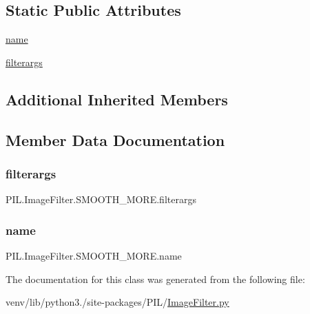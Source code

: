 \subsection*{Static Public Attributes}
\begin{DoxyCompactItemize}
\item 
\hyperlink{classPIL_1_1ImageFilter_1_1SMOOTH__MORE_ad59cec7725b103fb84d3dcf920c47fec}{name}
\item 
\hyperlink{classPIL_1_1ImageFilter_1_1SMOOTH__MORE_a916ddbacb9eecb9fd99a76a0aa2733a0}{filterargs}
\end{DoxyCompactItemize}
\subsection*{Additional Inherited Members}


\subsection{Member Data Documentation}
\mbox{\label{classPIL_1_1ImageFilter_1_1SMOOTH__MORE_a916ddbacb9eecb9fd99a76a0aa2733a0}} 
\subsubsection{\texorpdfstring{filterargs}{filterargs}}
{\footnotesize\ttfamily P\+I\+L.\+Image\+Filter.\+S\+M\+O\+O\+T\+H\+\_\+\+M\+O\+R\+E.\+filterargs\hspace{0.3cm}{\ttfamily [static]}}

\mbox{\label{classPIL_1_1ImageFilter_1_1SMOOTH__MORE_ad59cec7725b103fb84d3dcf920c47fec}} 
\subsubsection{\texorpdfstring{name}{name}}
{\footnotesize\ttfamily P\+I\+L.\+Image\+Filter.\+S\+M\+O\+O\+T\+H\+\_\+\+M\+O\+R\+E.\+name\hspace{0.3cm}{\ttfamily [static]}}



The documentation for this class was generated from the following file\+:\begin{DoxyCompactItemize}
\item 
venv/lib/python3./site-\/packages/\+P\+I\+L/\hyperlink{ImageFilter_8py}{Image\+Filter.\+py}\end{DoxyCompactItemize}
